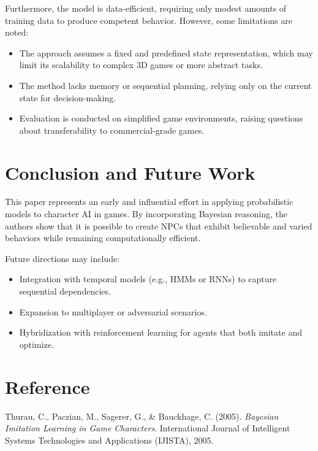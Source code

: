 \documentclass[12pt,a4paper]{article}
\begin{document}
Furthermore, the model is data-efficient, requiring only modest amounts of training data to produce competent behavior. However, some limitations are noted:

\begin{itemize}
  \item The approach assumes a fixed and predefined state representation, which may limit its scalability to complex 3D games or more abstract tasks.
  \item The method lacks memory or sequential planning, relying only on the current state for decision-making.
  \item Evaluation is conducted on simplified game environments, raising questions about transferability to commercial-grade games.
\end{itemize}

\section*{Conclusion and Future Work}

This paper represents an early and influential effort in applying probabilistic models to character AI in games. By incorporating Bayesian reasoning, the authors show that it is possible to create NPCs that exhibit believable and varied behaviors while remaining computationally efficient.

Future directions may include:
\begin{itemize}
  \item Integration with temporal models (e.g., HMMs or RNNs) to capture sequential dependencies.
  \item Expansion to multiplayer or adversarial scenarios.
  \item Hybridization with reinforcement learning for agents that both imitate and optimize.
\end{itemize}

\section*{Reference}

\noindent Thurau, C., Paczian, M., Sagerer, G., \& Bauckhage, C. (2005). \textit{Bayesian Imitation Learning in Game Characters}. International Journal of Intelligent Systems Technologies and Applications (IJISTA), 2005.
\end{document}

